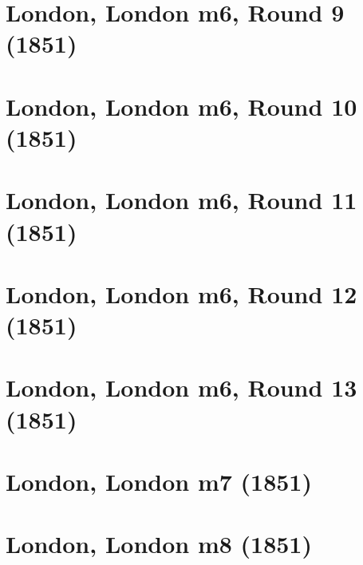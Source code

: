 \documentclass[11pt]{article}
\newcommand*\cleartoleftpage{%
   \clearpage
   \ifodd\value{page}\hbox{}\newpage\fi
}
\begin{document}
\cleartoleftpage

\section{London, London m6, Round 9 (1851)}


\cleartoleftpage

\section{London, London m6, Round 10 (1851)}


\cleartoleftpage

\section{London, London m6, Round 11 (1851)}


\cleartoleftpage

\section{London, London m6, Round 12 (1851)}


\cleartoleftpage

\section{London, London m6, Round 13 (1851)}


\cleartoleftpage

\section{London, London m7 (1851)}


\cleartoleftpage



\cleartoleftpage



\cleartoleftpage



\cleartoleftpage



\cleartoleftpage

\section{London, London m8 (1851)}

\end{document}
